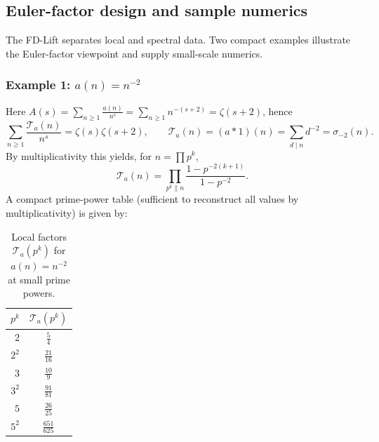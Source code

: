 \FloatBarrier

\subsection{Euler-factor design and sample numerics}
The FD-Lift separates local and spectral data. Two compact examples illustrate the Euler-factor viewpoint and supply small-scale numerics.

\subsubsection*{Example 1: $a(n)=n^{-2}$}
Here $A(s)=\sum_{n\ge1}\frac{a(n)}{n^{s}}=\sum_{n\ge1}n^{-(s+2)}=\zeta(s+2)$, hence
\[
\sum_{n\ge1}\frac{\mathcal{T}_a(n)}{n^{s}}=\zeta(s)\zeta(s+2),\qquad
\mathcal{T}_a(n)=(a*1)(n)=\sum_{d\mid n} d^{-2}=\sigma_{-2}(n).
\]
By multiplicativity this yields, for $n=\prod p^{k}$,
\[
\mathcal{T}_a(n)
=\prod_{p^k\parallel n}\frac{1-p^{-2(k+1)}}{1-p^{-2}}.
\]
A compact prime-power table (sufficient to reconstruct all values by multiplicativity) is given by:
\begin{table}[h]
\centering
\caption{Local factors $\mathcal{T}_a(p^k)$ for $a(n)=n^{-2}$ at small prime powers.}
\begin{tabular}{r c}
\toprule
$p^k$ & $\mathcal{T}_a(p^k)$\\
\midrule
$2$   & \(\frac{5}{4}\) \\
$2^2$ & \(\frac{21}{16}\) \\
$3$   & \(\frac{10}{9}\) \\
$3^2$ & \(\frac{91}{81}\) \\
$5$   & \(\frac{26}{25}\) \\
$5^2$ & \(\frac{651}{625}\) \\
\bottomrule
\end{tabular}
\end{table}


